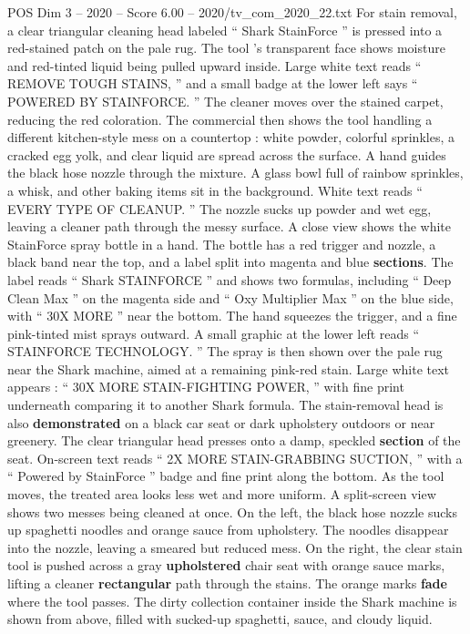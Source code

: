 \begin{textsample}{POS Dim 3 – 2020 – Score 6.00 – 2020/tv\_com\_2020\_22.txt}
For stain removal, a clear triangular cleaning head labeled “ Shark StainForce ” is pressed into a red-stained patch on the pale rug.
The tool ’s transparent face shows moisture and red-tinted liquid being pulled upward inside.
Large white text reads “ REMOVE TOUGH STAINS, ” and a small badge at the lower left says “ POWERED BY STAINFORCE. ” The cleaner moves over the stained carpet, reducing the red coloration.
The commercial then shows the tool handling a different kitchen-style mess on a countertop : white powder, colorful sprinkles, a cracked egg yolk, and clear liquid are spread across the surface.
A hand guides the black hose nozzle through the mixture.
A glass bowl full of rainbow sprinkles, a whisk, and other baking items sit in the background.
White text reads “ EVERY TYPE OF CLEANUP. ” The nozzle sucks up powder and wet egg, leaving a cleaner path through the messy surface.
A close view shows the white StainForce spray bottle in a hand.
The bottle has a red trigger and nozzle, a black band near the top, and a label split into magenta and blue \textbf{sections}.
The label reads “ Shark STAINFORCE ” and shows two formulas, including “ Deep Clean Max ” on the magenta side and “ Oxy Multiplier Max ” on the blue side, with “ 30X MORE ” near the bottom.
The hand squeezes the trigger, and a fine pink-tinted mist sprays outward.
A small graphic at the lower left reads “ STAINFORCE TECHNOLOGY. ” The spray is then shown over the pale rug near the Shark machine, aimed at a remaining pink-red stain.
Large white text appears : “ 30X MORE STAIN-FIGHTING POWER, ” with fine print underneath comparing it to another Shark formula.
The stain-removal head is also \textbf{demonstrated} on a black car seat or dark upholstery outdoors or near greenery.
The clear triangular head presses onto a damp, speckled \textbf{section} of the seat.
On-screen text reads “ 2X MORE STAIN-GRABBING SUCTION, ” with a “ Powered by StainForce ” badge and fine print along the bottom.
As the tool moves, the treated area looks less wet and more uniform.
A split-screen view shows two messes being cleaned at once.
On the left, the black hose nozzle sucks up spaghetti noodles and orange sauce from upholstery.
The noodles disappear into the nozzle, leaving a smeared but reduced mess.
On the right, the clear stain tool is pushed across a gray \textbf{upholstered} chair seat with orange sauce marks, lifting a cleaner \textbf{rectangular} path through the stains.
The orange marks \textbf{fade} where the tool passes.
The dirty collection container inside the Shark machine is shown from above, filled with sucked-up spaghetti, sauce, and cloudy liquid.

\end{textsample}
